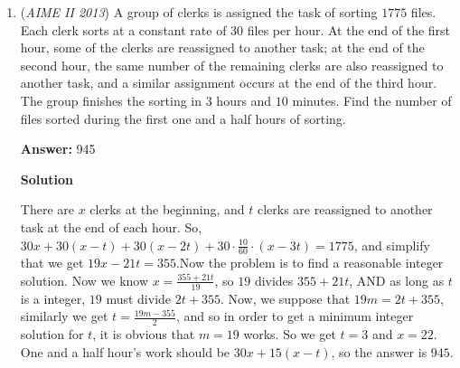 \begin{enumerate}
 



\textbf{Solution 4}

The goal is to find the least $N \in \mathbb{N}$ such that $\exists m \in \mathbb{N}$ where $m^2 + 1 \leq 1000N, 1000N + 1000 \leq (m+1)^2$.

 
Combining the two inequalities leads to $(m+1)^2 \geq m^2 + 1001, m \geq 500$.

 
Let $m = k + 500$, where $k \in \mathbb{W}$, then the inequalities become,

 $N \geq \frac{(k+500)^2 + 1}{1000} = \frac{k^2 + 1}{1000} + k + 250$, and

 $N \leq \frac{(k+501)^2}{1000} - 1 = \frac{(k+1)^2}{1000} + k + 250.$

 
For $k=31$, one can verify that $N = 282$ is the unique integer satisfying the inequalities.

 For $k \leq 30$, $k + 250 < \frac{k^2 + 1}{1000} + k + 250 \leq N$ $\leq \frac{(k+1)^2}{1000} + k + 250 \leq \frac{(30+1)^2}{1000} + k + 250 < k + 251$, 

 i.e., $k + 250 < N < k + 251$, a contradiction. 

 Note $k \geq 32$ leads to larger $N$(s).

 Hence, the answer is $\boxed{282}$.

 


 


	\item (\textit{AIME II 2013}) A group of clerks is assigned the task of sorting $1775$ files. Each clerk sorts at a constant rate of $30$ files per hour. At the end of the first hour, some of the clerks are reassigned to another task; at the end of the second hour, the same number of the remaining clerks are also reassigned to another task, and a similar assignment occurs at the end of the third hour. The group finishes the sorting in $3$ hours and $10$ minutes. Find the number of files sorted during the first one and a half hours of sorting.


 
 \textbf{Answer: }945



\textbf{Solution}

There are $x$ clerks at the beginning, and $t$ clerks are reassigned to another task at the end of each hour. So, $30x+30(x-t)+30(x-2t)+30\cdot\frac{10}{60} \cdot (x-3t)=1775$, and simplify that we get $19x-21t=355$.Now the problem is to find a reasonable integer solution. Now we know $x= \frac{355+21t}{19}$, so $19$ divides $355+21t$, AND as long as $t$ is a integer, $19$ must divide $2t+355$. Now, we suppose that $19m=2t+355$, similarly we get $t=\frac{19m-355}{2}$, and so in order to get a minimum integer solution for $t$, it is obvious that $m=19$ works. So we get $t=3$ and $x=22$.  One and a half hour's work should be $30x+15(x-t)$, so the answer is $\boxed{945}$.


\end{enumerate}
